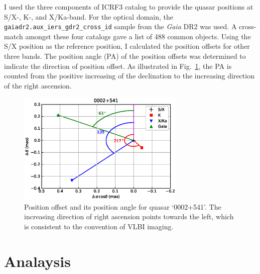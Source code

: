 \documentclass{aa}   %
\begin{document}
I used the three components of ICRF3 catalog to provide the quasar positions at S/X-, K-, and X/Ka-band.
For the optical domain, the \texttt{gaiadr2.aux\_iers\_gdr2\_cross\_id} sample from the {\it Gaia} DR2 was used.
A cross-match amongst these four catalogs gave a list of 488 common objects.
Using the S/X position as the reference position, I calculated the position offsets for other three bands.
The position angle (PA) of the position offsets was determined to indicate the direction of position offset.
As illustrated in Fig.~\ref{fig:illustration-diagram}, the PA is counted from the positive increasing of the declination to the increasing direction of the right ascension.


\begin{figure}[hbtp]
  \centering
  \includegraphics[width=80mm]{figs/illustration-diagram}
  \caption[]{\label{fig:illustration-diagram}
    Position offset and its position angle for quasar `0002+541'.
    The increasing direction of right ascension points towards the left, which is consistent to the convention of VLBI imaging.
  }
\end{figure}


\section{Analaysis}    \label{sec:analysis}

\end{document}

